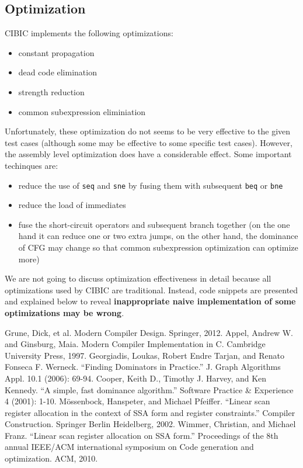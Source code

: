 \documentclass[10pt, a4paper]{article}
\begin{document}
\subsection{Optimization}
CIBIC implements the following optimizations: 
\begin{itemize}
    \item constant propagation
    \item dead code elimination
    \item strength reduction
    \item common subexpression eliminiation
\end{itemize}

Unfortunately, these optimization do not seems to be very effective to the
given test cases (although some may be effective to some specific test cases).
However, the assembly level optimization does have a considerable effect. Some important techinques are:
\begin{itemize}
    \item reduce the use of \texttt{seq} and \texttt{sne} by fusing them with subsequent \texttt{beq} or \texttt{bne}
    \item reduce the load of immediates
    \item fuse the short-circuit operators and subsequent branch together (on the one hand it can reduce one or two extra jumps, on the other hand, the dominance of CFG may change so that common subexpression optimization can optimize more)
\end{itemize}

We are not going to discuss optimization effectiveness in detail because all optimizations used by CIBIC are traditional. Instead, code snippets are presented and explained below to reveal \textbf{inappropriate naive implementation of some optimizations may be wrong}.
\begin{thebibliography}{9}
        Grune, Dick, et al. Modern Compiler Design. Springer, 2012.
        Appel, Andrew W. and Ginsburg, Maia. Modern Compiler Implementation in
        C. Cambridge University Press, 1997.
        Georgiadis, Loukas, Robert Endre Tarjan, and Renato Fonseca F. Werneck.
        ``Finding Dominators in Practice.'' J. Graph Algorithms Appl. 10.1
        (2006): 69-94.
        Cooper, Keith D., Timothy J. Harvey, and Ken Kennedy. ``A simple, fast
        dominance algorithm.'' Software Practice \& Experience 4 (2001): 1-10.
        M\"ossenb\:ock, Hanspeter, and Michael Pfeiffer. ``Linear scan register allocation
        in the context of SSA form and register constraints.'' Compiler Construction.
        Springer Berlin Heidelberg, 2002.
        Wimmer, Christian, and Michael Franz. ``Linear scan register allocation
        on SSA form.'' Proceedings of the 8th annual IEEE/ACM international
        symposium on Code generation and optimization. ACM, 2010. 
\end{thebibliography}
\end{document}
